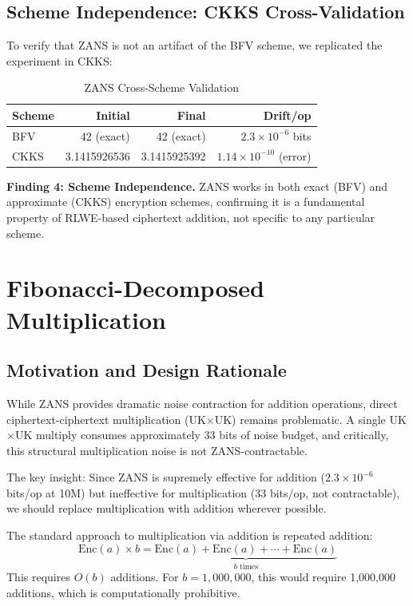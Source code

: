 \documentclass[11pt]{article}
\begin{document}
\subsection{Scheme Independence: CKKS Cross-Validation}

To verify that ZANS is not an artifact of the BFV scheme, we replicated the experiment in CKKS:

\begin{table}[h]
\centering
\caption{ZANS Cross-Scheme Validation}
\begin{tabular}{l|r|r|r}
\textbf{Scheme} & \textbf{Initial} & \textbf{Final} & \textbf{Drift/op} \\
\hline
BFV & 42 (exact) & 42 (exact) & $2.3 \times 10^{-6}$ bits \\
CKKS & 3.1415926536 & 3.1415925392 & $1.14 \times 10^{-10}$ (error)
\end{tabular}
\end{table}

\textbf{Finding 4: Scheme Independence.} ZANS works in both exact (BFV) and approximate (CKKS) encryption schemes, confirming it is a fundamental property of RLWE-based ciphertext addition, not specific to any particular scheme.

\section{Fibonacci-Decomposed Multiplication}

\subsection{Motivation and Design Rationale}

While ZANS provides dramatic noise contraction for addition operations, direct ciphertext-ciphertext multiplication (UK$\times$UK) remains problematic. A single UK$\times$UK multiply consumes approximately 33 bits of noise budget, and critically, this structural multiplication noise is not ZANS-contractable.

The key insight: Since ZANS is supremely effective for addition ($2.3 \times 10^{-6}$ bits/op at 10M) but ineffective for multiplication (33 bits/op, not contractable), we should replace multiplication with addition wherever possible.

The standard approach to multiplication via addition is repeated addition:
\begin{equation}
\text{Enc}(a) \times b = \underbrace{\text{Enc}(a) + \text{Enc}(a) + \cdots + \text{Enc}(a)}_{b \text{ times}}
\end{equation}
This requires $O(b)$ additions. For $b = 1,000,000$, this would require 1,000,000 additions, which is computationally prohibitive.
\end{document}
